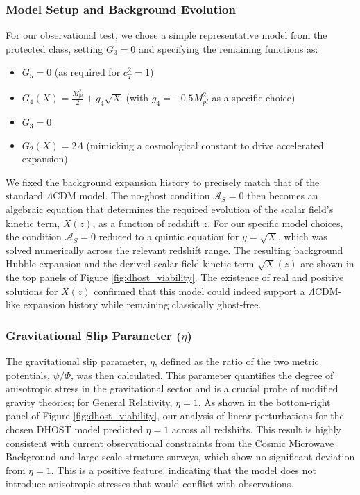 \documentclass[twocolumn]{aastex631}
\begin{document}
\subsubsection{Model Setup and Background Evolution}
For our observational test, we chose a simple representative model from the protected class, setting $G_3=0$ and specifying the remaining functions as:
\begin{itemize}
    \item $G_5 = 0$ (as required for $c_T^2=1$)
    \item $G_4(X) = \frac{M_{pl}^2}{2} + g_4 \sqrt{X}$ (with $g_4 = -0.5 M_{pl}^2$ as a specific choice)
    \item $G_3 = 0$
    \item $G_2(X) = 2\Lambda$ (mimicking a cosmological constant to drive accelerated expansion)
\end{itemize}
We fixed the background expansion history to precisely match that of the standard $\Lambda$CDM model. The no-ghost condition $\mathcal{A}_S=0$ then becomes an algebraic equation that determines the required evolution of the scalar field's kinetic term, $X(z)$, as a function of redshift $z$. For our specific model choices, the condition $\mathcal{A}_S=0$ reduced to a quintic equation for $y = \sqrt{X}$, which was solved numerically across the relevant redshift range. The resulting background Hubble expansion and the derived scalar field kinetic term $\sqrt{X}(z)$ are shown in the top panels of Figure \ref{fig:dhost_viability}. The existence of real and positive solutions for $X(z)$ confirmed that this model could indeed support a $\Lambda$CDM-like expansion history while remaining classically ghost-free.

\subsubsection{Gravitational Slip Parameter ($\eta$)}
The gravitational slip parameter, $\eta$, defined as the ratio of the two metric potentials, $\psi/\Phi$, was then calculated. This parameter quantifies the degree of anisotropic stress in the gravitational sector and is a crucial probe of modified gravity theories; for General Relativity, $\eta=1$. As shown in the bottom-right panel of Figure \ref{fig:dhost_viability}, our analysis of linear perturbations for the chosen DHOST model predicted $\eta=1$ across all redshifts. This result is highly consistent with current observational constraints from the Cosmic Microwave Background and large-scale structure surveys, which show no significant deviation from $\eta=1$. This is a positive feature, indicating that the model does not introduce anisotropic stresses that would conflict with observations.
\end{document}
